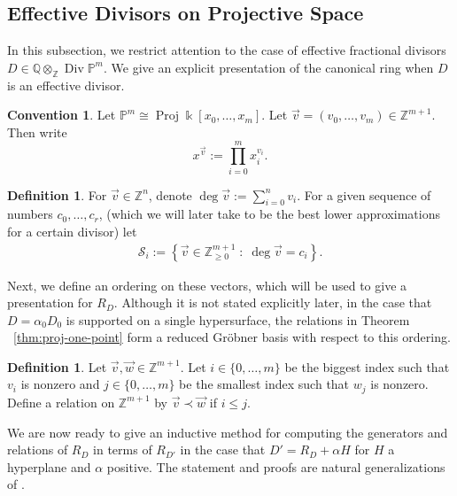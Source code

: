 \documentclass{amsart}
\theoremstyle{plain}
\theoremstyle{definition}
\newtheorem{defn}[thm]{Definition}
\newtheorem{convention}[thm]{Convention}
\theoremstyle{remark}
\numberwithin{equation}{section}
\newcommand\ssec{\subsection}
\newcommand\bq{{\mathbb Q}}
\newcommand\bp{{\mathbb P}}
\newcommand\bz{{\mathbb Z}}
\newcommand\bk{{\Bbbk}}
\DeclareMathOperator\di{Div}
\newcommand\mss{\mathscr{S}}
\DeclareMathOperator{\proj}{Proj}
\begin{document}
\ssec{Effective Divisors on Projective Space}
\label{ssec:proj-one-point}

In this subsection, we restrict attention to the case of effective
fractional divisors $D \in \bq \otimes_\bz \di \bp^m$. We give an explicit presentation of the canonical ring when $D$ is an effective
divisor.

\begin{convention}
Let $\bp^m \cong \proj \bk[x_0, \ldots, x_m]$. Let
$\vec{v} = (v_0, \ldots, v_m) \in \bz^{m + 1}$.  Then write
\[
	x^{\vec{v}} := \prod_{i = 0}^{m} x_i^{v_i}.
\]
\end{convention}

\begin{defn}
\label{defn:vec-sum}
For $\vec{v} \in \bz^n$, denote $\deg \vec{v} := \sum_{i = 0}
^n v_i$.
For a given sequence of numbers $c_0, \ldots, c_r$, (which
we will later take to be the best lower approximations
for a certain divisor) let 
\begin{align*}
	\mss_i := \left \{\vec{v} \in \bz_{\geq 0}^{m + 1} \; : \;
\deg \vec v = c_i \right\}.	
\end{align*}

\noindent
\end{defn}

Next, we define an ordering on these vectors, which will be used to give a presentation for $R_D$. Although it is not
stated explicitly later, in the case that $D = \alpha_0 D_0$ is supported on a single hypersurface, the relations in
Theorem ~\ref{thm:proj-one-point} form a reduced Gr\"{o}bner basis with 
respect to this ordering.

\begin{defn}
\label{defn:vec-order}
Let $\vec{v}, \vec{w} \in \bz^{m+1}$. Let $i \in \{0,\ldots, m\}$
be the biggest index such that $v_i$ is nonzero
and $j \in \{0,\ldots, m\}$ be the smallest index such that $w_j$ is
nonzero. Define a relation on $\bz^{m+1}$ by $\vec{v} \prec \vec{w}$ if $i \leq j$.
\end{defn}

We are now ready to give an inductive method for computing
the generators and relations of $R_D$ in terms of $R_{D'}$ 
in the case that $D' = R_D + \alpha H$ for $H$ a hyperplane and
$\alpha$ positive.
The statement and proofs are natural generalizations of
\cite[Theorem 6]{dorney:canonical}.
\end{document}
